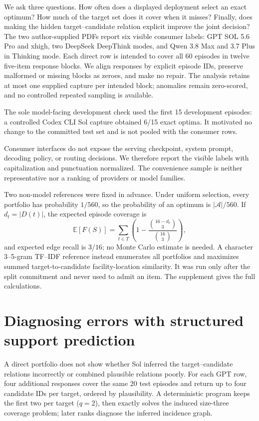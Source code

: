 We ask three questions.  How often does a displayed deployment select an exact
optimum?  How much of the target set does it cover when it misses?  Finally,
does making the hidden target--candidate relation explicit improve the joint
decision?  The two author-supplied PDFs report six visible consumer labels:
GPT SOL 5.6 Pro and xhigh, two DeepSeek DeepThink modes, and Qwen 3.8 Max and
3.7 Plus in Thinking mode.  Each direct row is intended to cover all 60
episodes in twelve five-item response blocks.  We align responses by explicit episode
IDs, preserve malformed or missing blocks as zeroes, and make no repair.  The
analysis retains at most one supplied capture per intended block; anomalies
remain zero-scored, and no controlled repeated sampling is available.

The sole model-facing development check used the first 15 development episodes:
a controlled Codex CLI Sol capture obtained 6/15 exact optima.  It motivated no
change to the committed test set and is not pooled with the consumer rows.

Consumer interfaces do not expose the serving checkpoint, system prompt,
decoding policy, or routing decisions.  We therefore report the visible labels
with capitalization and punctuation normalized.  The convenience sample is neither representative nor a ranking of
providers or model families.

Two non-model references were fixed in advance.  Under uniform selection,
every portfolio has probability $1/560$, so the probability of an optimum is
$|\mathcal A|/560$.  If $d_t=|D(t)|$, the expected episode coverage is
\[
 \mathbb E[F(S)]=\sum_{t\in T}\left(1-
 \frac{\binom{16-d_t}{3}}{\binom{16}{3}}\right),
\]
and expected edge recall is $3/16$; no Monte Carlo estimate is needed.  A
character 3--5-gram TF--IDF reference instead enumerates all portfolios and
maximizes summed target-to-candidate facility-location similarity.  It was run
only after the split commitment and never used to admit an item.  The
supplement gives the full calculations.



\section{Diagnosing errors with structured support prediction}

A direct portfolio does not show whether Sol inferred the target--candidate
relations incorrectly or combined plausible relations poorly.  For each GPT
row, four additional responses cover the same 20 test episodes and return up
to four candidate IDs per target, ordered by plausibility.  A deterministic
program keeps the first two per target ($q=2$), then exactly solves the induced
size-three coverage problem; later ranks diagnose the inferred incidence graph.

